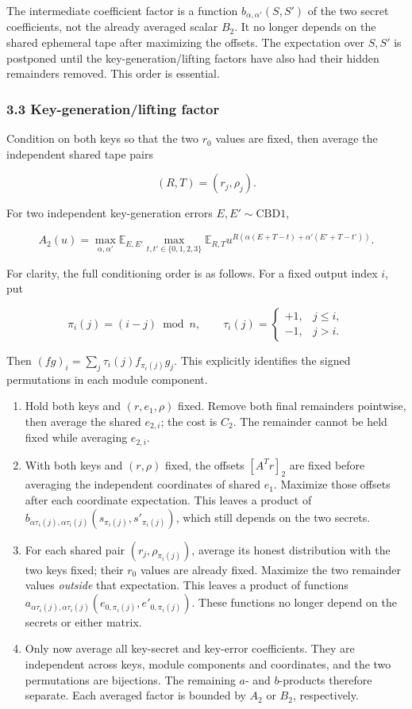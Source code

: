 \documentclass[11pt,a4paper]{article}
\providecommand{\tightlist}{\setlength{\itemsep}{0pt}\setlength{\parskip}{0pt}}
\begin{document}
The intermediate coefficient factor is a function \(b_{\alpha,\alpha'}(S,S')\) of the two secret coefficients, not the already averaged scalar \(B_2\). It no longer depends on the shared ephemeral tape after maximizing the offsets. The expectation over \(S,S'\) is postponed until the key-generation/lifting factors have also had their hidden remainders removed. This order is essential.

\subsubsection{3.3 Key-generation/lifting factor}\label{key-generationlifting-factor}

Condition on both keys so that the two \(r_0\) values are fixed, then average the independent shared tape pairs

\[
(R,T)=(r_j,\rho_j).
\]

For two independent key-generation errors \(E,E'\sim\mathrm{CBD1}\),

\[
A_2(u)
=
\max_{\alpha,\alpha'}
\mathbb E_{E,E'}
\max_{t,t'\in\{0,1,2,3\}}
\mathbb E_{R,T}
u^{R(\alpha(E+T-t)+\alpha'(E'+T-t'))}.
\]

For clarity, the full conditioning order is as follows. For a fixed output index \(i\), put

\[
\pi_i(j)=(i-j)\bmod n,\qquad
\tau_i(j)=\begin{cases}+1,&j\le i,\\-1,&j>i.\end{cases}
\]

Then \((fg)_i=\sum_j\tau_i(j)f_{\pi_i(j)}g_j\). This explicitly identifies the signed permutations in each module component.

\begin{enumerate}
\def\labelenumi{\arabic{enumi}.}
\tightlist
\item
  Hold both keys and \((r,e_1,\rho)\) fixed. Remove both final remainders pointwise, then average the shared \(e_{2,i}\); the cost is \(C_2\). The remainder cannot be held fixed while averaging \(e_{2,i}\).
\item
  With both keys and \((r,\rho)\) fixed, the offsets \([A^Tr]_2\) are fixed before averaging the independent coordinates of shared \(e_1\). Maximize those offsets after each coordinate expectation. This leaves a product of \(b_{\alpha\tau_i(j),\alpha\tau_i(j)}(s_{\pi_i(j)},s'_{\pi_i(j)})\), which still depends on the two secrets.
\item
  For each shared pair \((r_j,\rho_{\pi_i(j)})\), average its honest distribution with the two keys fixed; their \(r_0\) values are already fixed. Maximize the two remainder values \emph{outside} that expectation. This leaves a product of functions \(a_{\alpha\tau_i(j),\alpha\tau_i(j)}(e_{0,\pi_i(j)},e'_{0,\pi_i(j)})\). These functions no longer depend on the secrets or either matrix.
\item
  Only now average all key-secret and key-error coefficients. They are independent across keys, module components and coordinates, and the two permutations are bijections. The remaining \(a\)- and \(b\)-products therefore separate. Each averaged factor is bounded by \(A_2\) or \(B_2\), respectively.
\end{enumerate}
\end{document}
